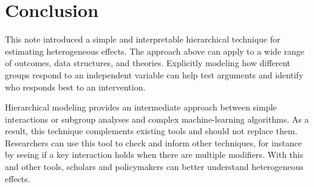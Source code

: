 \documentclass[12pt]{article}
\begin{document}
\section{Conclusion}

This note introduced a simple and interpretable hierarchical technique for estimating heterogeneous effects. 
The approach above can apply to a wide range of outcomes, data structures, and theories. 
Explicitly modeling how different groups respond to an independent variable can help test arguments and identify who responds best to an intervention. 


Hierarchical modeling provides an intermediate approach between simple interactions or subgroup analyses and complex machine-learning algorithms. 
As a result, this technique complements existing tools and should not replace them. 
Researchers can use this tool to check and inform other techniques, for instance by seeing if a key interaction holds when there are multiple modifiers. 
With this and other tools, scholars and policymakers can better understand heterogeneous effects.


\singlespace
 
 


%
\end{document}
